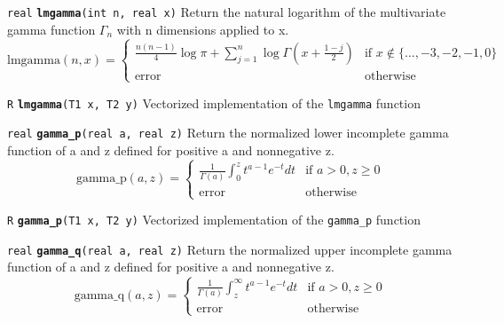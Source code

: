\documentclass[
  10pt,
]{book}
\begin{document}

\texttt{real} \textbf{\texttt{lmgamma}}\texttt{(int\ n,\ real\ x)}\newline
Return the natural logarithm of the multivariate gamma function
\(\Gamma_n\) with n dimensions applied to x. \[ \text{lmgamma}(n,x) =
\begin{cases} \frac{n(n-1)}{4} \log \pi + \sum_{j=1}^n \log
\Gamma\left(x + \frac{1 - j}{2}\right) & \text{if } x\not\in
\{\dots,-3,-2,-1,0\}\\ \textrm{error} & \text{otherwise} \end{cases}
\]


\texttt{R} \textbf{\texttt{lmgamma}}\texttt{(T1\ x,\ T2\ y)}\newline
Vectorized implementation of the \texttt{lmgamma} function


\texttt{real} \textbf{\texttt{gamma\_p}}\texttt{(real\ a,\ real\ z)}\newline
Return the normalized lower incomplete gamma function of a and z
defined for positive a and nonnegative z. \[ \mathrm{gamma\_p}(a,z) =
\begin{cases} \frac{1}{\Gamma(a)}\int_0^zt^{a-1}e^{-t}dt & \text{if }
a > 0, z \geq 0 \\ \textrm{error} & \text{otherwise} \end{cases} \]


\texttt{R} \textbf{\texttt{gamma\_p}}\texttt{(T1\ x,\ T2\ y)}\newline
Vectorized implementation of the \texttt{gamma\_p} function


\texttt{real} \textbf{\texttt{gamma\_q}}\texttt{(real\ a,\ real\ z)}\newline
Return the normalized upper incomplete gamma function of a and z
defined for positive a and nonnegative z. \[ \mathrm{gamma\_q}(a,z) =
\begin{cases} \frac{1}{\Gamma(a)}\int_z^\infty t^{a-1}e^{-t}dt &
\text{if } a > 0, z \geq 0 \\[6pt] \textrm{error} & \text{otherwise}
\end{cases} \]
\end{document}
